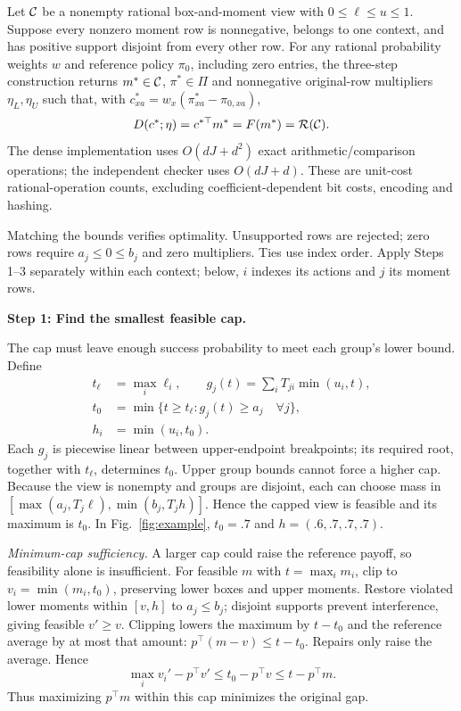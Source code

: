 \begin{theorem}\label{thm:partition-certificate}
Let $\mathcal{C}$ be a nonempty rational box-and-moment view with
$0\le\ell\le u\le1$. Suppose every nonzero moment row is nonnegative,
belongs to one context, and has positive support disjoint from every other
row. For any rational probability weights $w$ and reference policy $\pi_0$,
including zero entries, the three-step construction returns
$m^*\in\mathcal{C}$, $\pi^*\in\Pi$ and nonnegative original-row multipliers
$\eta_L,\eta_U$ such that, with $c^*_{xa}=w_x(\pi^*_{xa}-\pi_{0,xa})$,
\[
 D(c^*;\eta)=c^{*\top}m^*=F(m^*)=\mathcal R(\mathcal{C}).
\]
The dense implementation uses $O(dJ+d^2)$ exact arithmetic/comparison
operations; the independent checker uses $O(dJ+d)$. These are unit-cost
rational-operation counts, excluding coefficient-dependent bit costs,
encoding and hashing.
\end{theorem}

Matching the bounds verifies optimality. Unsupported rows are rejected; zero rows require $a_j\le0\le b_j$ and zero multipliers. Ties use index order. Apply Steps 1--3 separately within each context; below, $i$ indexes its actions and $j$ its moment rows.

\textbf{Step 1: Find the smallest feasible cap.}

The cap must leave enough success probability to meet each group's lower bound. Define
\[
 \begin{aligned}
 t_\ell&=\max_i\ell_i,\qquad g_j(t)=\sum_iT_{ji}\min(u_i,t),\\
 t_0&=\min\{t\ge t_\ell:g_j(t)\ge a_j\quad\forall j\},\\
 h_i&=\min(u_i,t_0).
 \end{aligned}
\]
Each $g_j$ is piecewise linear between upper-endpoint breakpoints; its required root, together with $t_\ell$, determines $t_0$. Upper group bounds cannot force a higher cap. Because the view is nonempty and groups are disjoint, each can choose mass in $[\max(a_j,T_j\ell),\min(b_j,T_jh)]$. Hence the capped view is feasible and its maximum is $t_0$. In Fig.~\ref{fig:example}, $t_0=.7$ and $h=(.6,.7,.7,.7)$.

\noindent\textit{Minimum-cap sufficiency.}
A larger cap could raise the reference payoff, so feasibility alone is insufficient. For feasible $m$ with $t=\max_i m_i$, clip to $v_i=\min(m_i,t_0)$, preserving lower boxes and upper moments. Restore violated lower moments within $[v,h]$ to $a_j\le b_j$; disjoint supports prevent interference, giving feasible $v'\ge v$. Clipping lowers the maximum by $t-t_0$ and the reference average by at most that amount: $p^\top(m-v)\le t-t_0$. Repairs only raise the average. Hence
\[
 \max_i v_i'-p^\top v'
 \le t_0-p^\top v
 \le t-p^\top m.
\]
Thus maximizing $p^\top m$ within this cap minimizes the original gap.

